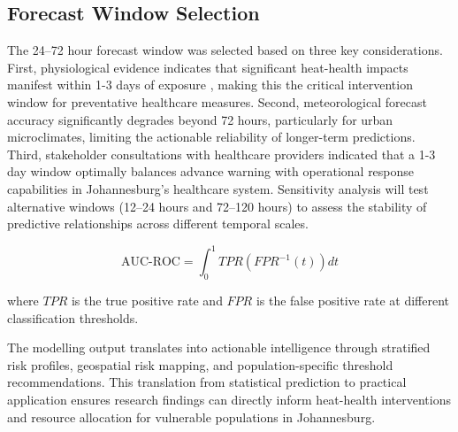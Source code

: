\subsection{Forecast Window Selection}
The 24--72 hour forecast window was selected based on three key considerations. First, physiological evidence indicates that significant heat-health impacts manifest within 1-3 days of exposure \citep{Gasparrini2015, Kinney2020}, making this the critical intervention window for preventative healthcare measures. Second, meteorological forecast accuracy significantly degrades beyond 72 hours, particularly for urban microclimates, limiting the actionable reliability of longer-term predictions. Third, stakeholder consultations with healthcare providers indicated that a 1-3 day window optimally balances advance warning with operational response capabilities in Johannesburg's healthcare system. Sensitivity analysis will test alternative windows (12--24 hours and 72--120 hours) to assess the stability of predictive relationships across different temporal scales.

\begin{equation}
\text{AUC-ROC} = \int^1_0 TPR(FPR^{-1}(t))dt
\end{equation}

where $TPR$ is the true positive rate and $FPR$ is the false positive rate at different classification thresholds.

The modelling output translates into actionable intelligence through stratified risk profiles, geospatial risk mapping, and population-specific threshold recommendations. This translation from statistical prediction to practical application ensures research findings can directly inform heat-health interventions and resource allocation for vulnerable populations in Johannesburg.